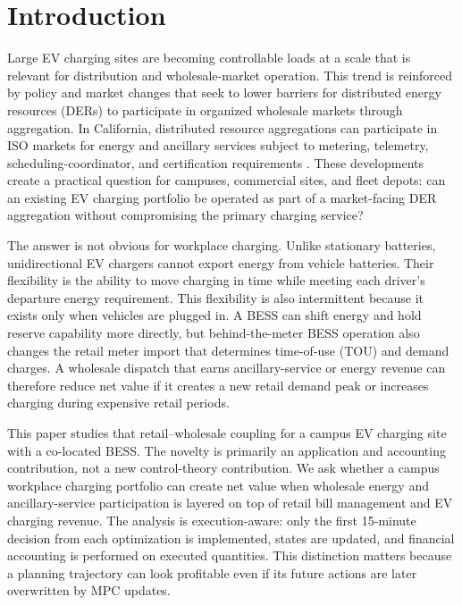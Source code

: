 \documentclass[final,5p,times]{elsarticle}
\begin{document}
\section{Introduction}
\label{sec:introduction}

Large EV charging sites are becoming controllable loads at a scale that is relevant for distribution and wholesale-market operation. This trend is reinforced by policy and market changes that seek to lower barriers for distributed energy resources (DERs) to participate in organized wholesale markets through aggregation. In California, distributed resource aggregations can participate in ISO markets for energy and ancillary services subject to metering, telemetry, scheduling-coordinator, and certification requirements \cite{ferc2222,caisoDERP}. These developments create a practical question for campuses, commercial sites, and fleet depots: can an existing EV charging portfolio be operated as part of a market-facing DER aggregation without compromising the primary charging service?

The answer is not obvious for workplace charging. Unlike stationary batteries, unidirectional EV chargers cannot export energy from vehicle batteries. Their flexibility is the ability to move charging in time while meeting each driver's departure energy requirement. This flexibility is also intermittent because it exists only when vehicles are plugged in. A BESS can shift energy and hold reserve capability more directly, but behind-the-meter BESS operation also changes the retail meter import that determines time-of-use (TOU) and demand charges. A wholesale dispatch that earns ancillary-service or energy revenue can therefore reduce net value if it creates a new retail demand peak or increases charging during expensive retail periods.

This paper studies that retail--wholesale coupling for a campus EV charging site with a co-located BESS. The novelty is primarily an application and accounting contribution, not a new control-theory contribution. We ask whether a campus workplace charging portfolio can create net value when wholesale energy and ancillary-service participation is layered on top of retail bill management and EV charging revenue. The analysis is execution-aware: only the first 15-minute decision from each optimization is implemented, states are updated, and financial accounting is performed on executed quantities. This distinction matters because a planning trajectory can look profitable even if its future actions are later overwritten by MPC updates.
\end{document}
